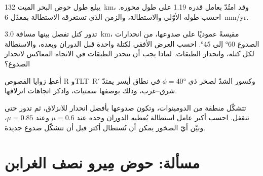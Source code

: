 \begin{exercise}[$\star\star$]\label{exo:b3:extension-strike-slip:9}
يبلغ طول حوض البحر الميت \qty{132}{km}، وقد امتُدّ بعامل قدره 1.19
على طول محوره. احسب طوله الأوّلي والاستطالة، والزمن الذي تستغرقه
الاستطالة بمعدّل \qty{6}{mm/yr}.
\end{exercise}

\begin{exercise}[$\star\star\star$]\label{exo:b3:extension-strike-slip:10}
تدور كتل تفصل بينها مسافة \qty{3.0}{km}، مقيسةً عموديًا على صدوعها،
من انحدارات الصدوع \ang{60} إلى \ang{45}. احسب العرض الأفقي لكتلة واحدة
قبل الدوران وبعده، والاستطالة لكل كتلة، وانحدار الطبقات.
لماذا يجب أن تنحدر الطبقات في الاتجاه المعاكس لانحدار الصدوع؟
\end{exercise}

\begin{exercise}[$\star\star\star$]\label{exo:b3:extension-strike-slip:11}
أعطِ زوايا القصوص R و\mbox{\textdir TLT R$'$} وكسور الشدّ لصخر
ذي $\phi = \ang{40}$ في نطاق أيسر يمتدّ شرق--غرب،
وذلك بوصفها سمتيات، واذكر اتجاهات انزلاقها.
\end{exercise}

\begin{exercise}[$\star\star\star$]\label{exo:b3:extension-strike-slip:12}
تتشكّل منطقة من الدومينوات، وتكون صدوعها بأفضل انحدار للانزلاق،
ثم تدور حتى تنقفل. احسب أكبر عامل استطالة يُعطيه الدوران وحده
عند $\mu = 0.6$ وعند $\mu = 0.85$، وبيّن أيّ الصخور يمكن أن تُستطال
أكثر قبل أن تتشكّل صدوع جديدة.
\end{exercise}

\section{مسألة: حوض مِيرو نصف الغرابن}

